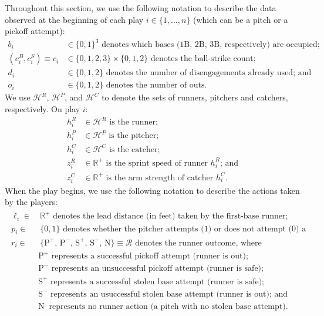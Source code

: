 \documentclass{article}
\begin{document}
    Throughout this section, we use the following notation to describe the data observed at the beginning of each play $i \in \{1, ..., n\}$ (which can be a pitch or a pickoff attempt):
    \begin{align*}
      b_i & \in \{0, 1\}^3 \mbox{ denotes which bases (1B, 2B, 3B, respectively) are occupied;}\\
      (c_i^B, c_i^S) \equiv c_i & \in \{0, 1, 2, 3\} \times \{0, 1, 2\} \mbox{ denotes the ball-strike count;}\\
      d_i & \in \{0, 1, 2\} \mbox{ denotes the number of disengagements already used; and}\\
      o_i & \in \{0, 1, 2\} \mbox{ denotes the number of outs.}
    \end{align*}
    We use $\mathcal{H}^R$, $\mathcal{H}^P$, and $\mathcal{H}^C$ to denote the sets of runners, pitchers and catchers, respectively. On play $i$:
    \begin{align*}
      h_i^R & \in \mathcal{H}^R \mbox{ is the runner;}\\
      h_i^P & \in \mathcal{H}^P \mbox{ is the pitcher;}\\
      h_i^C & \in \mathcal{H}^C \mbox{ is the catcher;}\\
      z_i^R & \in \mathbb{R^+} \mbox{ is the sprint speed of runner $h_i^R$; and}\\
      z_i^C & \in \mathbb{R^+} \mbox{ is the arm strength of catcher $h_i^C$.}
    \end{align*}
    When the play begins, we use the following notation to describe the actions taken by the players:
    \begin{align}
    \label{eqn:runner-outcome}
      \begin{split}
        \ell_i  \in &~ \mathbb{R}^+ \mbox{ denotes the lead distance (in feet) taken by the first-base runner;}\\
        p_i \in &~ \{0, 1\} \mbox{ denotes whether the pitcher attempts (1) or does not attempt (0) a pickoff; and}\\
        r_i \in &~ \{\mbox{P}^+,\, \mbox{P}^-,\, \mbox{S}^+,\, \mbox{S}^-,\, \mbox{N}\} \equiv \mathcal{R} \mbox{ denotes the runner outcome, where}\\
          & \mbox{P}^+  \mbox{ represents a successful pickoff attempt (runner is out);}\\
          & \mbox{P}^-  \mbox{ represents an unsuccessful pickoff attempt (runner is safe);}\\
          & \mbox{S}^+  \mbox{ represents a successful stolen base attempt (runner is safe);}\\
          & \mbox{S}^-  \mbox{ represents an usuccessful stolen base attempt (runner is out); and}\\
          & \mbox{N}~   \mbox{ represents no runner action (a pitch with no stolen base attempt).}
      \end{split}
    \end{align}
\end{document}
